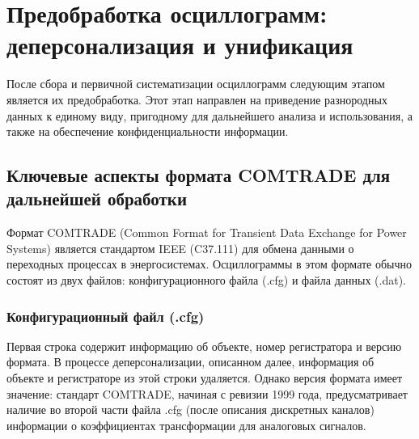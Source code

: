 
\section{Предобработка осциллограмм: деперсонализация и унификация}\label{sec:ch3_preprocessing_depersonalization}

После сбора и первичной систематизации осциллограмм следующим этапом является их предобработка. Этот этап направлен на приведение разнородных данных к единому виду, пригодному для дальнейшего анализа и использования, а также на обеспечение конфиденциальности информации.\par\vspace{0.2cm}

\subsection{Ключевые аспекты формата COMTRADE для дальнейшей обработки}\label{sec:ch3_comtrade_aspects}

Формат COMTRADE (Common Format for Transient Data Exchange for Power Systems) является стандартом IEEE (C37.111) для обмена данными о переходных процессах в энергосистемах. Осциллограммы в этом формате обычно состоят из двух файлов: конфигурационного файла (.cfg) и файла данных (.dat).\par\vspace{0.2cm}

\subsubsection{Конфигурационный файл (.cfg)}\label{sec:ch3_comtrade_cfg}

Первая строка содержит информацию об объекте, номер регистратора и версию формата. В процессе деперсонализации, описанном далее, информация об объекте и регистраторе из этой строки удаляется. Однако версия формата имеет значение: стандарт COMTRADE, начиная с ревизии 1999 года, предусматривает наличие во второй части файла .cfg (после описания дискретных каналов) информации о коэффициентах трансформации для аналоговых сигналов.\par\vspace{0.2cm}

